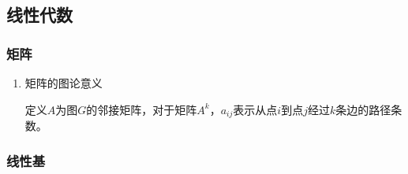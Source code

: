 \documentclass[11pt]{article}
\begin{document}
\subsection{线性代数}
\label{sec-1-2}
\subsubsection{矩阵}
\label{sec-1-2-1}
\begin{enumerate}
\item 矩阵的图论意义
\label{sec-1-2-1-1}

定义\(A\)为图\(G\)的邻接矩阵，对于矩阵\(A^k\)，\(a_{ij}\)表示从点\(i\)到点\(j\)经过\(k\)条边的路径条数。
\end{enumerate}

\subsubsection{线性基}
\label{sec-1-2-2}
\end{document}
